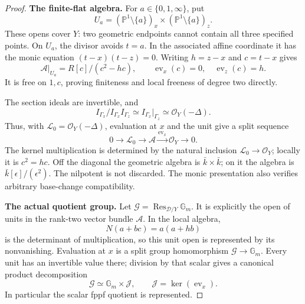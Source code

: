 \begin{proof}
\par\smallskip\noindent\textbf{The finite-flat algebra.}\quad
For \(a\in\{0,1,\infty\}\), put
\[
 U_a=(\mathbb P^1\setminus\{a\})_x
                \times(\mathbb P^1\setminus\{a\})_z.
\]
These opens cover \(Y\): two geometric endpoints
cannot contain all three specified points.
On \(U_a\), the divisor avoids \(t=a\).
In the associated affine coordinate it has
the monic equation \((t-x)(t-z)=0\).
Writing \(h=z-x\) and \(c=t-x\) gives
\begin{equation}\label{eq:variableQuotientAlgebra}
 \mathcal A|_{U_a}=R[c]/(c^2-hc),\qquad
 \operatorname{ev}_x(c)=0,\quad
 \operatorname{ev}_z(c)=h.
\end{equation}
It is free on \(1,c\), proving finiteness and
local freeness of degree two directly.

The section ideals are invertible, and
\[
 I_{\Gamma_x}/I_{\Gamma_x}I_{\Gamma_z}
       \simeq I_{\Gamma_x}|_{\Gamma_z}
       \simeq\mathcal O_Y(-\Delta).
\]
Thus, with \(\mathcal L_0=\mathcal O_Y(-\Delta)\),
evaluation at \(x\) and the unit give a split sequence
\begin{equation}\label{eq:variableQuotientAugmentation}
 0\longrightarrow\mathcal L_0
 \longrightarrow\mathcal A
 \xrightarrow{\operatorname{ev}_x}\mathcal O_Y
 \longrightarrow0.
\end{equation}
The kernel multiplication is determined by the
natural inclusion \(\mathcal L_0\to\mathcal O_Y\);
locally it is \(c^2=hc\).
Off the diagonal the geometric algebra is
\(\bar k\times\bar k\); on it the algebra is
\(\bar k[\epsilon]/(\epsilon^2)\).
The nilpotent is not discarded.
The monic presentation also verifies arbitrary
base-change compatibility.

\par\smallskip\noindent\textbf{The actual quotient group.}\quad
Let \(\mathcal G=\operatorname{Res}_{\mathscr D/Y}\mathbb G_m\).
It is explicitly the open of units in the rank-two
vector bundle \(\mathcal A\). In the local algebra,
\[
                 N(a+bc)=a(a+hb)
\]
is the determinant of multiplication, so this
unit open is represented by its nonvanishing.
Evaluation at \(x\) is a split group homomorphism
\(\mathcal G\to\mathbb G_m\).
Every unit has an invertible value there; division
by that scalar gives a canonical product decomposition
\[
 \mathcal G\simeq\mathbb G_m\times\mathcal J,\qquad
 \mathcal J=\ker(\operatorname{ev}_x).
\]
In particular the scalar fppf quotient is represented.


\end{proof}
